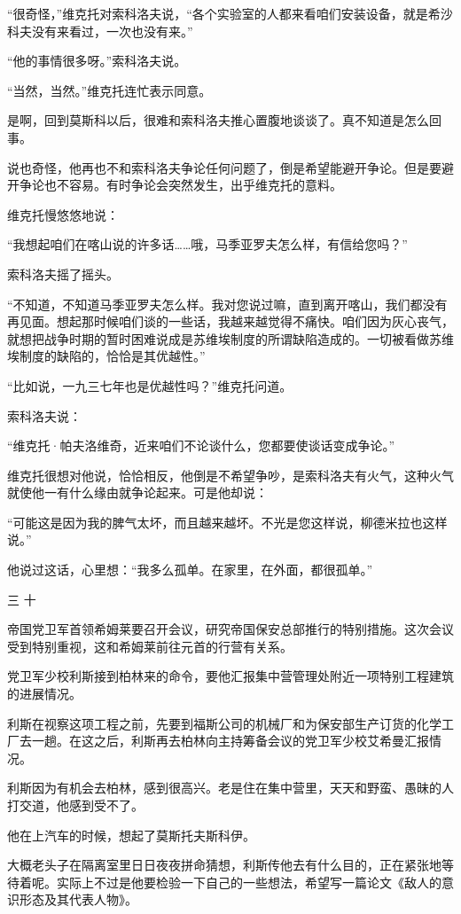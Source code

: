 “很奇怪，”维克托对索科洛夫说，“各个实验室的人都来看咱们安装设备，就是希沙科夫没有来看过，一次也没有来。”

“他的事情很多呀。”索科洛夫说。

“当然，当然。”维克托连忙表示同意。

是啊，回到莫斯科以后，很难和索科洛夫推心置腹地谈谈了。真不知道是怎么回事。

说也奇怪，他再也不和索科洛夫争论任何问题了，倒是希望能避开争论。但是要避开争论也不容易。有时争论会突然发生，出乎维克托的意料。

维克托慢悠悠地说：

“我想起咱们在喀山说的许多话……哦，马季亚罗夫怎么样，有信给您吗？”

索科洛夫摇了摇头。

“不知道，不知道马季亚罗夫怎么样。我对您说过嘛，直到离开喀山，我们都没有再见面。想起那时候咱们谈的一些话，我越来越觉得不痛快。咱们因为灰心丧气，就想把战争时期的暂时困难说成是苏维埃制度的所谓缺陷造成的。一切被看做苏维埃制度的缺陷的，恰恰是其优越性。”

“比如说，一九三七年也是优越性吗？”维克托问道。

索科洛夫说：

“维克托·帕夫洛维奇，近来咱们不论谈什么，您都要使谈话变成争论。”

维克托很想对他说，恰恰相反，他倒是不希望争吵，是索科洛夫有火气，这种火气就使他一有什么缘由就争论起来。可是他却说：

“可能这是因为我的脾气太坏，而且越来越坏。不光是您这样说，柳德米拉也这样说。”

他说过这话，心里想：“我多么孤单。在家里，在外面，都很孤单。”

三 十

帝国党卫军首领希姆莱要召开会议，研究帝国保安总部推行的特别措施。这次会议受到特别重视，这和希姆莱前往元首的行营有关系。

党卫军少校利斯接到柏林来的命令，要他汇报集中营管理处附近一项特别工程建筑的进展情况。

利斯在视察这项工程之前，先要到福斯公司的机械厂和为保安部生产订货的化学工厂去一趟。在这之后，利斯再去柏林向主持筹备会议的党卫军少校艾希曼汇报情况。

利斯因为有机会去柏林，感到很高兴。老是住在集中营里，天天和野蛮、愚昧的人打交道，他感到受不了。

他在上汽车的时候，想起了莫斯托夫斯科伊。

大概老头子在隔离室里日日夜夜拼命猜想，利斯传他去有什么目的，正在紧张地等待着呢。实际上不过是他要检验一下自己的一些想法，希望写一篇论文《敌人的意识形态及其代表人物》。

